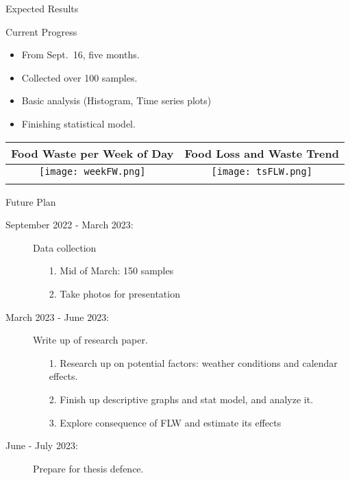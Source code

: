 \documentclass{beamer}\usepackage[]{graphicx}\usepackage[]{xcolor}
\begin{document}
\begin{frame}{Expected Results}
    \begin{block}{Current Progress}
        \begin{itemize}
            \item From Sept.~16, five months.
            \item Collected over 100 samples.
            \item Basic analysis (Histogram, Time series plots)
            \item Finishing statistical model.
        \end{itemize}

        \begin{table}[]
            \begin{tabular}{cc}
                \hline
                    \small Food Waste per Week of Day & Food Loss and Waste Trend \\ \hline
                    \texttt{[image: weekFW.png]}
                    & 
                    \texttt{[image: tsFLW.png]}\\
                    &      \\
                \hline
            \end{tabular}
        \end{table}
    \end{block}
\end{frame}

\begin{frame}{Future Plan}
    \begin{description}
        \item [September 2022 - March 2023:] Data collection
        \begin{enumerate}
            \item[1.] Mid of March: 150 samples
            \item[2.] Take photos for presentation
        \end{enumerate}
        \item [March 2023 - June 2023:] Write up of research paper.
        \begin{enumerate}
            \item[1.] Research up on potential factors: weather conditions and calendar effects.
            \item[2.] Finish up descriptive graphs and stat model, and analyze it.
            \item[3.] Explore consequence of FLW and estimate its effects
        \end{enumerate}
        \item [June - July 2023:] Prepare for thesis defence.
    \end{description}
\end{frame}
\end{document}
